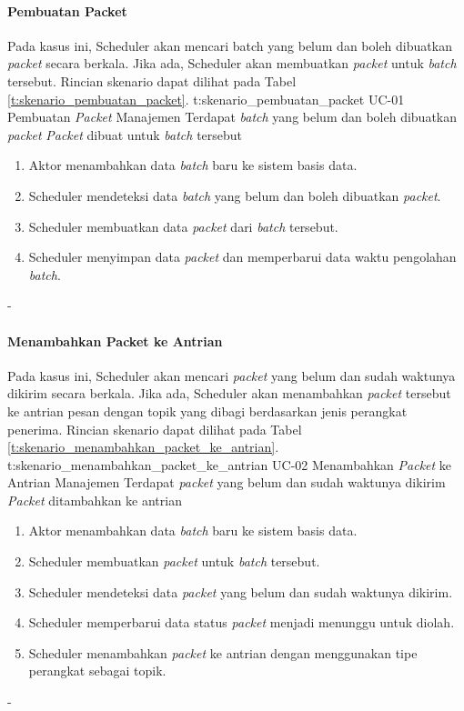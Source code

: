 \paragraph{Pembuatan Packet}
\par Pada kasus ini, Scheduler akan mencari batch yang belum dan boleh dibuatkan \textit{packet} secara berkala. Jika ada, Scheduler akan membuatkan \textit{packet} untuk \textit{batch} tersebut. Rincian skenario dapat dilihat pada Tabel \ref{t:skenario_pembuatan_packet}.
\tableUcDesc
{t:skenario_pembuatan_packet}
{UC-01}
{Pembuatan \textit{Packet}}
{Manajemen}
{Terdapat \textit{batch} yang belum dan boleh dibuatkan \textit{packet}}
{\textit{Packet} dibuat untuk \textit{batch} tersebut}
{
\begin{enumerate}
	\item Aktor menambahkan data \textit{batch} baru ke sistem basis data.
    \item Scheduler mendeteksi data \textit{batch} yang belum dan boleh dibuatkan \textit{packet}.
    \item Scheduler membuatkan data \textit{packet} dari \textit{batch} tersebut.
    \item Scheduler menyimpan data \textit{packet} dan memperbarui data waktu pengolahan \textit{batch}.
\end{enumerate}
}
{-}

\paragraph{Menambahkan Packet ke Antrian}
\par Pada kasus ini, Scheduler akan mencari \textit{packet} yang belum dan sudah waktunya dikirim secara berkala. Jika ada, Scheduler akan menambahkan \textit{packet} tersebut ke antrian pesan dengan topik yang dibagi berdasarkan jenis perangkat penerima. Rincian skenario dapat dilihat pada Tabel \ref{t:skenario_menambahkan_packet_ke_antrian}.
\tableUcDesc
{t:skenario_menambahkan_packet_ke_antrian}
{UC-02}
{Menambahkan \textit{Packet} ke Antrian}
{Manajemen}
{Terdapat \textit{packet} yang belum dan sudah waktunya dikirim}
{\textit{Packet} ditambahkan ke antrian}
{
\begin{enumerate}
    \item Aktor menambahkan data \textit{batch} baru ke sistem basis data.
    \item Scheduler membuatkan \textit{packet} untuk \textit{batch} tersebut.
    \item Scheduler mendeteksi data \textit{packet} yang belum dan sudah waktunya dikirim.
    \item Scheduler memperbarui data status \textit{packet} menjadi menunggu untuk diolah.
    \item Scheduler menambahkan \textit{packet} ke antrian dengan menggunakan tipe perangkat sebagai topik.
\end{enumerate}
}
{-}

